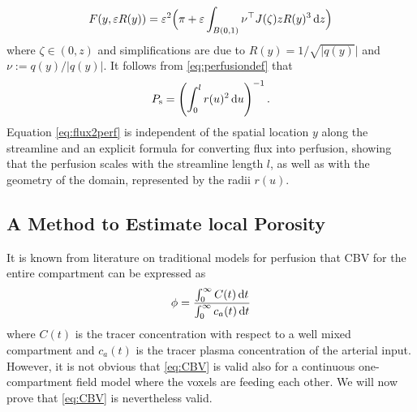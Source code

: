 \documentclass[journal,twocolumn]{IEEEtran}
\newcommand{\Perfs}{P_{\mathrm{s}}}
\begin{document}
	\begin{equation}
		F(y,\varepsilon R(y))
		= \varepsilon^2 \Big(\pi + \varepsilon \int_{B(0,1)} \nu^\top J(\zeta)zR(y)^3 \,\mathrm{d} z\Big)
	\end{equation}
	where $\zeta \in (0,z)$ and simplifications are due to $R(y) = 1/\sqrt{\vert q(y)} \vert$ and $\nu:=q(y)/\vert q(y) \vert$.
	It follows from \eqref{eq:perfusiondef} that
	\begin{equation}\label{eq:flux2perf}
		\Perfs= \left(\int_0^l r(u)^2 \diffint u\right)^{-1}.
	\end{equation}
	Equation \eqref{eq:flux2perf} is independent of the spatial location $y$ along the streamline and an explicit formula for converting flux into perfusion, showing that the perfusion scales with the streamline length $l$, as well as with the geometry of the domain, represented by the radii $r(u)$.
	

	

	\subsection{A Method to Estimate local Porosity}\label{sec:CBV}
	
	It is known from literature on traditional models for perfusion that CBV for the entire compartment can be expressed as
	\begin{equation}
		\phi = \frac{\int_0^\infty C(t) \diffint t}{\int_0^\infty c_a(t) \diffint t}
		\label{eq:CBV}
	\end{equation}
	where $C(t)$ is the tracer concentration with respect to a well mixed compartment and $c_a(t)$ is the tracer plasma concentration of the arterial input.
	However, it is not obvious that \eqref{eq:CBV} is valid also for a continuous one-compartment field model where the voxels are feeding each other. We will now prove that \eqref{eq:CBV} is nevertheless valid.
	
\end{document}
